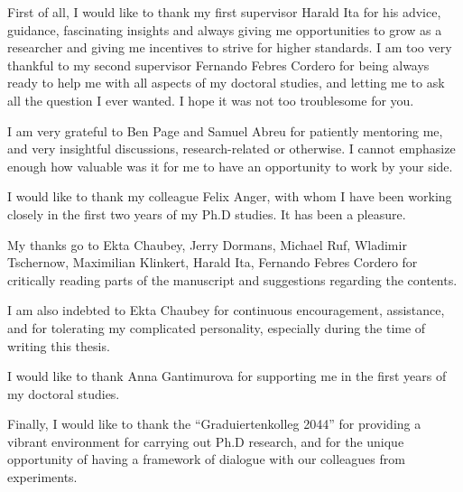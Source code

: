 {
  \setlength{\parskip}{2pt}
  First of all, I would like to thank my first supervisor Harald Ita for his advice, guidance, fascinating insights
  and always giving me opportunities to grow as a researcher and giving me incentives to strive for higher standards.
  I am too very thankful to my second supervisor Fernando Febres Cordero for 
  being always ready to help me with all aspects of my doctoral studies,
  and letting me to ask all the question I ever wanted.
  I hope it was not too troublesome for you.

  I am very grateful to Ben Page and Samuel Abreu for patiently mentoring me,
  and very insightful discussions, research-related or otherwise.
  I cannot emphasize enough how valuable was it for me to have an opportunity to work by your side.

  I would like to thank my colleague Felix Anger, with whom I have been working closely in the first two years of my Ph.D studies.
  It has been a pleasure.

  My thanks go to Ekta Chaubey, Jerry Dormans, Michael Ruf, Wladimir Tschernow, Maximilian Klinkert, Harald Ita, Fernando Febres Cordero for critically reading parts of the manuscript and suggestions
  regarding the contents.

  I am also indebted to Ekta Chaubey for continuous encouragement, assistance, and for tolerating my complicated personality, especially during the time of writing this thesis. 

  I would like to thank Anna Gantimurova for supporting me in the first years of my doctoral studies.

  Finally, I would like to thank the ``Graduiertenkolleg 2044'' for providing a vibrant environment for carrying out Ph.D research,   
  and for the unique opportunity of having a framework of dialogue with our colleagues from experiments. 






}
